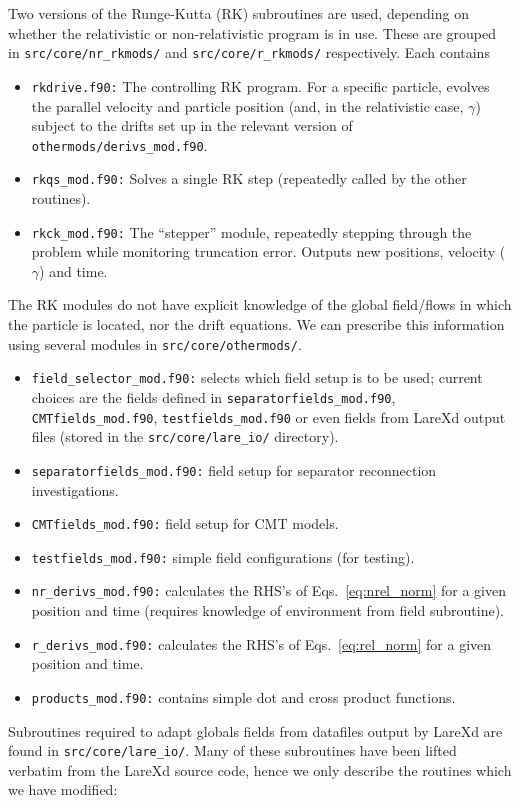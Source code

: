 \documentclass[a4paper,11pt,usenames,dvipsnames]{article}
\begin{document}
\noindent Two versions of the Runge-Kutta (RK) subroutines are used, depending on whether the relativistic or non-relativistic program is in use. These are grouped in \texttt{src/core/nr\_rkmods/} and \texttt{src/core/r\_rkmods/} respectively. Each contains
\begin{itemize}
 \item{\texttt{rkdrive.f90:}} The controlling RK program. For a specific particle, evolves the parallel velocity and particle position (and, in the relativistic case, $\gamma$) subject to the drifts set up in the relevant version of \texttt{othermods/derivs\_mod.f90}.
 \item{\texttt{rkqs\_mod.f90:}} Solves a single RK step (repeatedly called by the other routines).
 \item{\texttt{rkck\_mod.f90:}} The ``stepper'' module, repeatedly stepping through the problem while monitoring truncation error. Outputs new positions, velocity ($\gamma$) and time. 
\end{itemize}
\noindent The RK modules do not have explicit knowledge of the global field/flows in which the particle is located, nor the drift equations. We can prescribe this information using several modules in \texttt{src/core/othermods/}.
\begin{itemize}
 \item{\texttt{field\_selector\_mod.f90:}} selects which field setup is to be used; current choices are the fields defined in \texttt{separatorfields\_mod.f90}, \texttt{CMTfields\_mod.f90}, \texttt{testfields\_mod.f90} or even fields from LareXd output files (stored in the \texttt{src/core/lare\_io/} directory).
 \item{\texttt{separatorfields\_mod.f90:}} field setup for separator reconnection investigations.
 \item{\texttt{CMTfields\_mod.f90:}} field setup for CMT models.
 \item{\texttt{testfields\_mod.f90:}} simple field configurations (for testing).
 \item{\texttt{nr\_derivs\_mod.f90:}} calculates the RHS's of Eqs.~\ref{eq:nrel_norm} for a given position and time (requires knowledge of environment from field subroutine).
 \item{\texttt{r\_derivs\_mod.f90:}} calculates the RHS's of Eqs.~\ref{eq:rel_norm} for a given position and time.
 \item{\texttt{products\_mod.f90:}} contains simple dot and cross product functions.
\end{itemize}
Subroutines required to adapt globals fields from datafiles output by LareXd are found in \texttt{src/core/lare\_io/}. Many of these subroutines have been lifted verbatim from the LareXd source code, hence we only describe the routines which we have modified:
\end{document}
